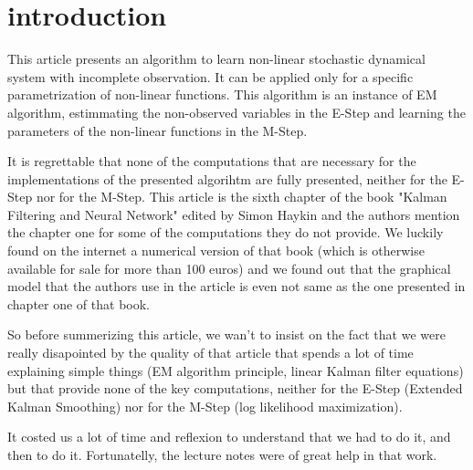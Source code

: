 \section*{introduction}

This article presents an algorithm to learn non-linear stochastic dynamical system with incomplete observation.
It can be applied only for a specific parametrization of non-linear functions.
This algorithm is an instance of EM algorithm, estimmating the non-observed variables in the E-Step and learning the parameters of the non-linear functions in the M-Step.

It is regrettable that none of the computations that are necessary for the implementations of the presented algorihtm are fully presented, neither for the E-Step nor for the M-Step.
This article is the sixth chapter of the book "Kalman Filtering and Neural Network" edited by Simon Haykin and the authors mention the chapter one for some of the computations they do not provide.
We luckily found on the internet a numerical version of that book (which is otherwise available for sale for more than 100 euros) and we found out that the graphical model that the authors use in the article is even not same as the one presented in chapter one of that book.

So before summerizing this article, we wan't to insist on the fact that we were really disapointed by the quality of that article that spends a lot of time explaining simple things (EM algorithm principle, linear Kalman filter equations) but that provide none of the key computations, neither for the E-Step (Extended Kalman Smoothing) nor for the M-Step (log likelihood maximization).

It costed us a lot of time and reflexion to understand that we had to do it, and then to do it.
Fortunatelly, the lecture notes were of great help in that work.
